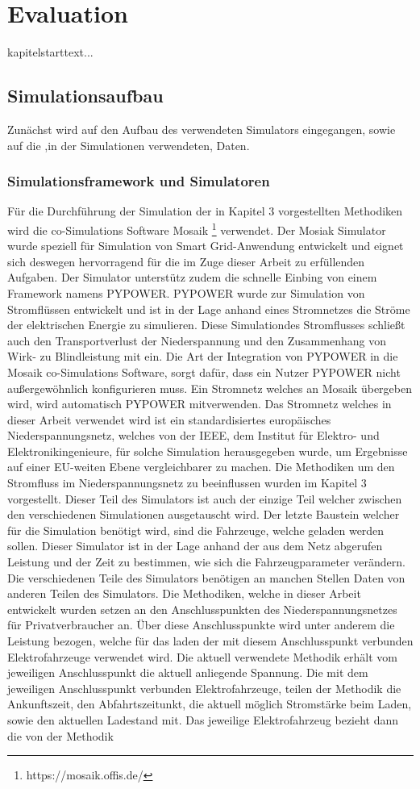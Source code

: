\chapter{Evaluation}
kapitelstarttext...
\section{Simulationsaufbau}
Zunächst wird auf den Aufbau des verwendeten Simulators eingegangen, sowie auf die ,in der Simulationen verwendeten, Daten.
\subsection{Simulationsframework und Simulatoren}
Für die Durchführung der Simulation der in Kapitel 3 vorgestellten Methodiken wird die co-Simulations Software Mosaik \footnote{https://mosaik.offis.de/} verwendet. Der Mosiak Simulator wurde speziell für Simulation von Smart Grid-Anwendung entwickelt und eignet sich deswegen hervorragend für die im Zuge dieser Arbeit zu erfüllenden Aufgaben. Der Simulator unterstütz zudem die schnelle Einbing von einem Framework namens PYPOWER. PYPOWER wurde zur Simulation von Stromflüssen entwickelt und ist in der Lage anhand eines Stromnetzes die Ströme der elektrischen Energie zu simulieren. Diese Simulationdes Stromflusses schließt auch den Transportverlust der Niederspannung und den Zusammenhang von Wirk- zu Blindleistung mit ein. Die Art der Integration von PYPOWER in die Mosaik co-Simulations Software, sorgt dafür, dass ein Nutzer PYPOWER nicht außergewöhnlich konfigurieren muss. Ein Stromnetz welches an Mosaik übergeben wird, wird automatisch PYPOWER mitverwenden. Das Stromnetz welches in dieser Arbeit verwendet wird ist ein standardisiertes europäisches Niederspannungsnetz, welches von der IEEE, dem Institut für Elektro- und Elektronikingenieure, für solche Simulation herausgegeben wurde, um Ergebnisse auf einer EU-weiten Ebene vergleichbarer zu machen. Die Methodiken um den Stromfluss im Niederspannungsnetz zu beeinflussen wurden im Kapitel 3 vorgestellt. Dieser Teil des Simulators ist auch der einzige Teil welcher zwischen den verschiedenen Simulationen ausgetauscht wird. Der letzte Baustein welcher für die Simulation benötigt wird, sind die Fahrzeuge, welche geladen werden sollen. Dieser Simulator ist in der Lage anhand der aus dem Netz abgerufen Leistung und der Zeit zu bestimmen, wie sich die Fahrzeugparameter verändern. Die verschiedenen Teile des Simulators benötigen an manchen Stellen Daten von anderen Teilen des Simulators. Die Methodiken, welche in dieser Arbeit entwickelt wurden setzen an den Anschlusspunkten des Niederspannungsnetzes für Privatverbraucher an. Über diese Anschlusspunkte wird unter anderem die Leistung bezogen, welche für das laden der mit diesem Anschlusspunkt verbunden Elektrofahrzeuge verwendet wird. Die aktuell verwendete Methodik erhält vom jeweiligen Anschlusspunkt die aktuell anliegende Spannung. Die mit dem jeweiligen Anschlusspunkt verbunden Elektrofahrzeuge, teilen der Methodik die Ankunftszeit, den Abfahrtszeitunkt, die aktuell möglich Stromstärke beim Laden, sowie den aktuellen Ladestand mit. Das jeweilige Elektrofahrzeug bezieht dann die von der Methodik 